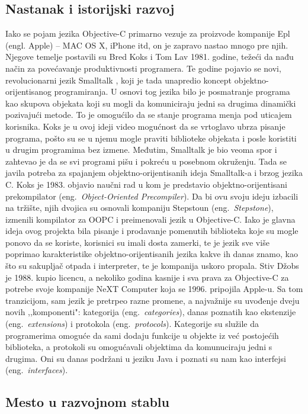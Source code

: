 \documentclass[a4paper]{article}
\begin{document}
\subsection{Nastanak i istorijski razvoj}
\label{subsec:istorija}
Iako se pojam jezika Objective-C primarno vezuje za proizvode kompanije Epl (engl. Apple) -- MAC OS X, iPhone itd, on je zapravo nastao mnogo pre njih. Njegove temelje postavili su Bred Koks i Tom Lav 1981. godine, težeći da nađu način za povećavanje produktivnosti programera. Te godine pojavio se novi, revolucionarni jezik Smalltalk \cite{smalltalk}, koji je tada unapredio koncept objektno-orijentisanog programiranja. U osnovi tog jezika bilo je posmatranje programa kao skupova objekata koji su mogli da komuniciraju jedni sa drugima dinamički pozivajući metode. To je omogućilo da se stanje programa menja pod uticajem korisnika. Koks je u ovoj ideji video mogućnost da se vrtoglavo ubrza pisanje programa, pošto su se u njemu mogle praviti biblioteke objekata i posle koristiti u drugim programima bez izmene. Međutim, Smalltalk je bio veoma spor i zahtevao je da se svi programi pišu i pokreću u posebnom okruženju. Tada se javila potreba za spajanjem objektno-orijentisanih ideja Smalltalk-a i brzog jezika C. Koks je 1983. objavio naučni rad u kom je predstavio objektno-orijentisani prekompilator (eng.~{\em Object-Oriented Precompiler}). Da bi ovu svoju ideju izbacili na tržište, njih dvojica su osnovali kompaniju Stepstoun (eng.~{\em Stepstone}), izmenili kompilator za OOPC i preimenovali jezik u Objective-C. Iako je glavna ideja ovog projekta bila pisanje i prodavanje pomenutih biblioteka koje su mogle ponovo da se koriste, korisnici su imali dosta zamerki, te je jezik sve više poprimao karakteristike objektno-orijentisanih jezika kakve ih danas znamo, kao što su sakupljač otpada i interpreter, te je kompanija uskoro propala. Stiv Džobs je 1988. kupio licencu, a nekoliko godina kasnije i sva prava za Objective-C za potrebe svoje kompanije NeXT Computer koja se  1996. pripojila Apple-u. Sa tom tranzicijom, sam jezik je pretrpeo razne promene, a najvažnije su uvođenje dveju novih ,,komponenti": kategorija (eng.~{\em categories}), danas poznatih kao ekstenzije (eng.~{\em extensions}) i protokola (eng.~{\em protocols}). Kategorije su služile da programerima omoguće da sami dodaju funkcije u objekte iz već postojećih biblioteka, a protokoli su omogućavali objektima da komunuciraju jedni s drugima. Oni su danas podržani u jeziku Java i poznati su nam kao interfejsi (eng.~{\em interfaces}). 

\subsection{Mesto u razvojnom stablu}
\label{subsec:stablo}
\end{document}
